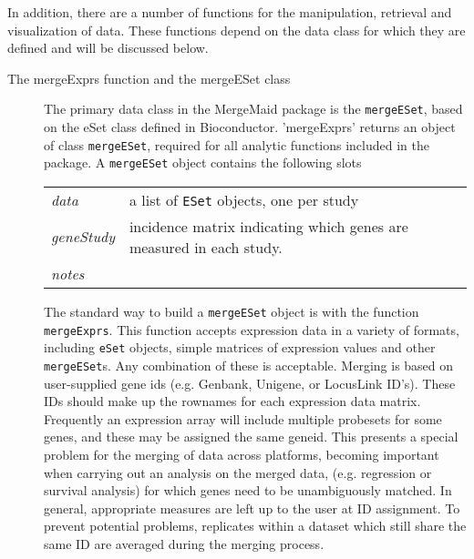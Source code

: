 \documentclass[12pt]{article}
\begin{document}
In addition, there are a number of functions for the manipulation,
retrieval and visualization of data.  These functions depend on the
data class for which they are defined and will be discussed below.
\begin{description}
\item[The mergeExprs function and the mergeESet class]
The primary data class in the MergeMaid package is the
\verb+mergeESet+, based on the eSet class defined in Bioconductor.
'mergeExprs' returns an object of class \verb+mergeESet+, required
for all analytic functions included in the package.  A
\verb+mergeESet+ object contains the following slots

\begin{center}
  \begin{tabular}{|lp{5in}|}
    \hline
    {\it data} & a list of \verb+ESet+ objects, one per study\\
    {\it geneStudy} & incidence matrix indicating which genes are measured in each study. \\
    {\it notes} & \\\hline
  \end{tabular}
\end{center}
The standard way to build a \verb+mergeESet+ object is with the
function \verb+mergeExprs+. This function accepts expression data in
a variety of formats, including \verb+eSet+ objects, simple matrices
of expression values and other \verb+mergeESet+s.  Any combination
of these is acceptable.    Merging is based on user-supplied gene
ids (e.g. Genbank, Unigene, or LocusLink ID's). These IDs should
make up the rownames for each expression data matrix.   Frequently
an expression array will include multiple probesets for some genes,
and these may be assigned the same geneid. This presents a special
problem for the merging of data across platforms, becoming important
when carrying out an analysis on the merged data, (e.g. regression
or survival analysis) for which genes need to be unambiguously
matched.  In general, appropriate measures are left up to the user
at ID assignment.  To prevent potential problems, replicates within
a dataset which still share the same ID are averaged during the
merging process.


\end{description}
\end{document}
